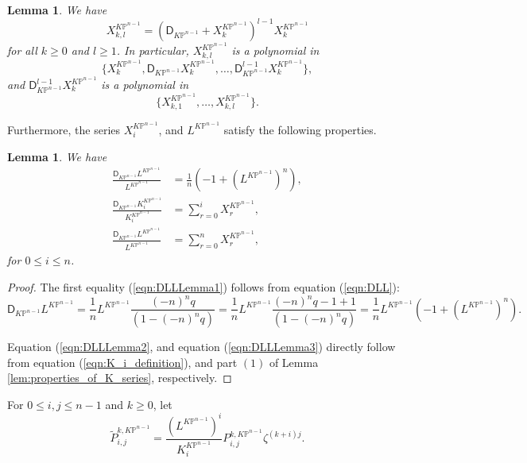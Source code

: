 \documentclass[12pt]{amsart}
\newtheorem{lem}[prop]{Lemma}
\numberwithin{equation}{section}
\newcommand{\KP}{K\mathbb{P}}
\begin{document}
\begin{lem}\label{lem:Xkl_generation}
We have
\begin{equation*}
X^{\KP^{n-1}}_{k,l}=\left(\mathsf{D}_{\KP^{n-1}}+X^{\KP^{n-1}}_k\right)^{l-1}X^{\KP^{n-1}}_k
\end{equation*}
for all $k\geq{0}$ and $l\geq{1}$. In particular, $X^{\KP^{n-1}}_{k,l}$ is a polynomial in $$\{X^{\KP^{n-1}}_k, \mathsf{D}_{\KP^{n-1}}X^{\KP^{n-1}}_k,\ldots,\mathsf{D}_{\KP^{n-1}}^{l-1}X^{\KP^{n-1}}_k\},$$ and $\mathsf{D}_{\KP^{n-1}}^{l-1}X^{\KP^{n-1}}_k$ is a polynomial in $$\{X^{\KP^{n-1}}_{k,1},\ldots,X^{\KP^{n-1}}_{k,l}\}.$$
\end{lem}

Furthermore, the series $X^{\KP^{n-1}}_i$, and $L^{\KP^{n-1}}$ satisfy the following properties.

\begin{lem}\label{lem:DLLemma}
We have
\begin{align}
\frac{\mathsf{D}_{\KP^{n-1}}L^{\KP^{n-1}}}{L^{\KP^{n-1}}}&=\frac{1}{n}\left(-1+(L^{\KP^{n-1}})^n\right),\label{eqn:DLLLemma1}\\
\frac{\mathsf{D}_{\KP^{n-1}}K^{\KP^{n-1}}_i}{K^{\KP^{n-1}}_i}&=\sum_{r=0}^iX^{\KP^{n-1}}_r,\label{eqn:DLLLemma2}\\
\frac{\mathsf{D}_{\KP^{n-1}}L^{\KP^{n-1}}}{L^{\KP^{n-1}}}&=\sum_{r=0}^nX^{\KP^{n-1}}_r,\label{eqn:DLLLemma3}
\end{align}
for $0\leq{i}\leq{n}$.
\end{lem}

\begin{proof}
The first equality (\ref{eqn:DLLLemma1}) follows from equation (\ref{eqn:DLL}):
\begin{equation*}
\mathsf{D}_{\KP^{n-1}}L^{\KP^{n-1}}
=\frac{1}{n}L^{\KP^{n-1}}\frac{(-n)^nq}{(1-(-n)^nq)}
=\frac{1}{n}L^{\KP^{n-1}}\frac{(-n)^nq-1+1}{(1-(-n)^nq)}
=\frac{1}{n}L^{\KP^{n-1}}\left(-1+(L^{\KP^{n-1}})^n\right).
\end{equation*}

Equation (\ref{eqn:DLLLemma2}, and equation (\ref{eqn:DLLLemma3}) directly follow from equation (\ref{eqn:K_i_definition}), and part $(1)$ of Lemma \ref{lem:properties_of_K_series}, respectively.
\end{proof}

For $0\leq{i,j}\leq{n-1}$ and $k\geq{0}$, let 
\begin{equation}\label{eqn:Flat_to_modflat_KP_2}
\widetilde{P}_{i,j}^{k,\KP^{n-1}}=\frac{(L^{\KP^{n-1}})^i}{K^{\KP^{n-1}}_i}P_{i,j}^{k,\KP^{n-1}}\zeta^{(k+i)j}.
\end{equation}
\end{document}
